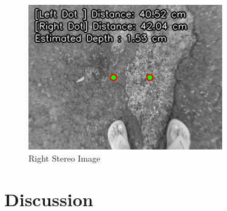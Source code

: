 \begin{figure}[htbp]
\begin{minipage}{0.32\textwidth}
		\includegraphics[width=\textwidth]{right.png}
		\caption{Right Stereo Image}
		\label{fig:image3}
	\end{minipage}
\end{figure}



\section{Discussion}

